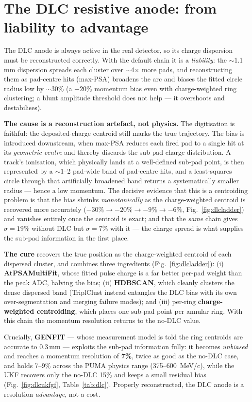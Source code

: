 \documentclass[11pt,a4paper]{article}
\begin{document}
\section{The DLC resistive anode: from liability to advantage}
The DLC anode is always active in the real detector, so its charge dispersion must be
reconstructed correctly. With the default chain it is a \emph{liability}: the $\sim$1.1\,mm
dispersion spreads each cluster over $\sim$4$\times$ more pads, and reconstructing them as
pad-centre hits (max-PSA) broadens the arc and biases the fitted circle radius low by $\sim$30\%
(a $-20\%$ momentum bias even with charge-weighted ring clustering; a blunt amplitude threshold does
not help --- it overshoots and destabilises).

\textbf{The cause is a reconstruction artefact, not physics.} The digitisation is faithful: the
deposited-charge centroid still marks the true trajectory. The bias is introduced downstream, when
max-PSA reduces each fired pad to a single hit at its \emph{geometric centre} and thereby discards
the sub-pad charge distribution. A track's ionisation, which physically lands at a well-defined
sub-pad point, is then represented by a $\sim$1--2 pad-wide band of pad-centre hits, and a
least-squares circle through that artificially broadened band returns a systematically smaller
radius --- hence a low momentum. The decisive evidence that this is a centroiding problem is that
the bias shrinks \emph{monotonically} as the charge-weighted centroid is recovered more accurately
($-30\% \to -20\% \to -9\% \to -6\%$, Fig.~\ref{fig:dlcladder}) and vanishes entirely once the
centroid is exact; and that the \emph{same} chain gives $\sigma=19\%$ without DLC but $\sigma=7\%$
with it --- the charge spread is what supplies the sub-pad information in the first place.

\textbf{The cure} recovers the true position as the charge-weighted centroid of each dispersed
cluster, and combines three ingredients
(Fig.~\ref{fig:dlcladder}): (i) \textbf{AtPSAMultiFit}, whose fitted pulse charge is a far better
per-pad weight than the peak ADC, halving the bias; (ii) \textbf{HDBSCAN}, which cleanly clusters the
dense dispersed band (TriplClust instead entangles the DLC bias with its own over-segmentation and
merging failure modes); and (iii) per-ring \textbf{charge-weighted centroiding}, which places one
sub-pad point per annular ring. With this chain the momentum resolution returns to the no-DLC value.

Crucially, \textbf{GENFIT} --- whose measurement model is told the ring centroids are accurate to
0.3\,mm --- exploits the sub-pad information fully: it becomes \emph{unbiased} and reaches a momentum
resolution of \textbf{7\%}, twice as good as the no-DLC case, and holds 7--9\% across the PUMA physics
range (375--\SI{600}{MeV/c}), while the UKF recovers only the no-DLC 15\% and keeps a small residual
bias (Fig.~\ref{fig:dlcukfgf}, Table~\ref{tab:dlc}). Properly reconstructed, the DLC anode is a
resolution \emph{advantage}, not a cost.
\end{document}
